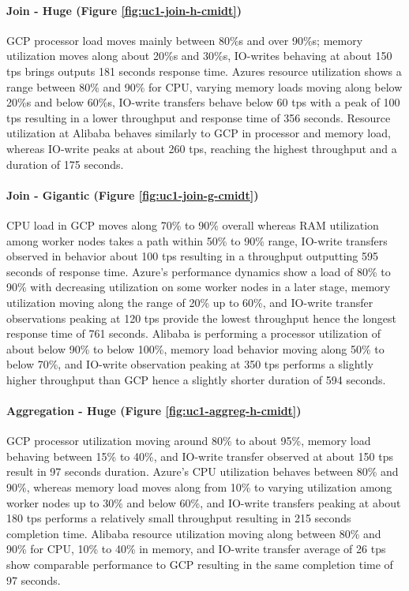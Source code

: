 \documentclass[review]{elsarticle}
\begin{document}
\paragraph{Join - Huge (Figure \ref{fig:uc1-join-h-cmidt})}GCP processor load moves mainly between 80\%s and over 90\%s; memory utilization moves along about 20\%s and 30\%s, IO-writes behaving at about 150 tps brings outputs 181 seconds response time. Azures resource utilization shows a range between 80\% and 90\% for CPU, varying memory loads moving along below 20\%s and below 60\%s, IO-write transfers behave below 60 tps with a peak of 100 tps resulting in a lower throughput and response time of 356 seconds. Resource utilization at Alibaba behaves similarly to GCP in processor and memory load, whereas IO-write peaks at about 260 tps, reaching the highest throughput and a duration of 175 seconds.

\paragraph{Join - Gigantic (Figure \ref{fig:uc1-join-g-cmidt})}CPU load in GCP moves along 70\% to 90\% overall whereas RAM utilization among worker nodes takes a path within 50\% to 90\% range, IO-write transfers observed in behavior about 100 tps resulting in a throughput outputting 595 seconds of response time. Azure's performance dynamics show a load of 80\% to 90\% with decreasing utilization on some worker nodes in a later stage, memory utilization moving along the range of 20\% up to 60\%, and IO-write transfer observations peaking at 120 tps provide the lowest throughput hence the longest response time of 761 seconds. Alibaba is performing a processor utilization of about below 90\% to below 100\%, memory load behavior moving along 50\% to below 70\%, and IO-write observation peaking at 350 tps performs a slightly higher throughput than GCP hence a slightly shorter duration of 594 seconds.

\paragraph{Aggregation - Huge (Figure \ref{fig:uc1-aggreg-h-cmidt})}GCP processor utilization moving around 80\% to about 95\%, memory load behaving between 15\% to 40\%, and IO-write transfer observed at about 150 tps result in 97 seconds duration. Azure's CPU utilization behaves between 80\% and 90\%, whereas memory load moves along from 10\% to varying utilization among worker nodes up to 30\% and below 60\%, and IO-write transfers peaking at about 180 tps performs a relatively small throughput resulting in 215 seconds completion time. Alibaba resource utilization moving along between 80\% and 90\% for CPU, 10\% to 40\% in memory, and IO-write transfer average of 26 tps show comparable performance to GCP resulting in the same completion time of 97 seconds.
\end{document}
